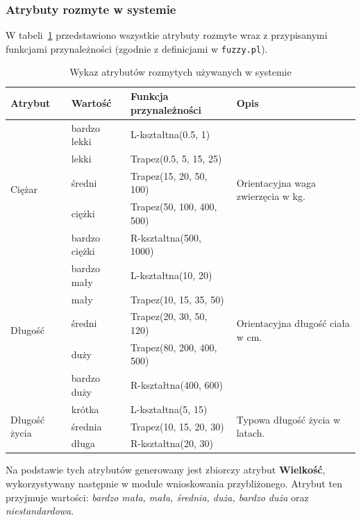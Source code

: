 \documentclass[11pt,a4paper]{article}
\newcommand{\code}[1]{\texttt{#1}}
\begin{document}
\subsubsection{Atrybuty rozmyte w systemie}
W tabeli~\ref{tab:fuzzy} przedstawiono wszystkie atrybuty rozmyte wraz
z przypisanymi funkcjami przynależności (zgodnie z definicjami w \code{fuzzy.pl}).

\begin{table}[h]
\centering
\caption{Wykaz atrybutów rozmytych używanych w systemie}
\label{tab:fuzzy}
\begin{tabularx}{\linewidth}{l l l X}
\toprule
\textbf{Atrybut} & \textbf{Wartość} & \textbf{Funkcja przynależności} & \textbf{Opis} \\
\midrule
\multirow{5}{*}{Ciężar}
 & bardzo lekki  & L-kształtna(0.5, 1)        & \multirow{5}{=}{Orientacyjna waga zwierzęcia w kg.} \\
 & lekki         & Trapez(0.5, 5, 15, 25)     & \\
 & średni        & Trapez(15, 20, 50, 100)    & \\
 & ciężki        & Trapez(50, 100, 400, 500)  & \\
 & bardzo ciężki & R-kształtna(500, 1000)     & \\
\midrule
\multirow{5}{*}{Długość}
 & bardzo mały  & L-kształtna(10, 20)        & \multirow{5}{=}{Orientacyjna długość ciała w cm.} \\
 & mały         & Trapez(10, 15, 35, 50)     & \\
 & średni       & Trapez(20, 30, 50, 120)    & \\
 & duży         & Trapez(80, 200, 400, 500)  & \\
 & bardzo duży  & R-kształtna(400, 600)      & \\
\midrule
\multirow{3}{*}{Długość życia}
 & krótka  & L-kształtna(5, 15)       & \multirow{3}{=}{Typowa długość życia w latach.} \\
 & średnia & Trapez(10, 15, 20, 30)   & \\
 & długa   & R-kształtna(20, 30)      & \\
\bottomrule
\end{tabularx}
\end{table}

Na podstawie tych atrybutów generowany jest zbiorczy atrybut \textbf{Wielkość},
wykorzystywany następnie w module wnioskowania przybliżonego. Atrybut ten
przyjmuje wartości: \textit{bardzo mała, mała, średnia, duża, bardzo duża}
oraz \textit{niestandardowa}.
\end{document}
